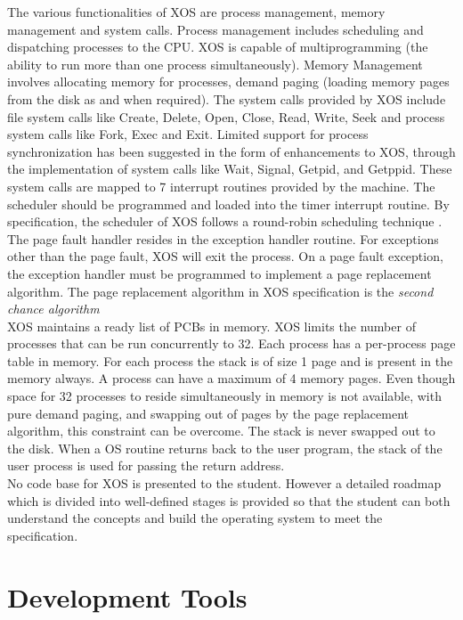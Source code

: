 \documentclass[10pt]{report}
\begin{document}
The various functionalities of XOS are process management, memory management and system calls. Process management includes scheduling and dispatching processes to the CPU. XOS is capable of multiprogramming (the ability to run more than one process simultaneously). Memory Management involves allocating memory for processes, demand paging (loading memory pages from the disk as and when required). The system calls provided by XOS include file system calls like Create, Delete, Open, Close, Read, Write, Seek and process system calls like Fork, Exec and Exit. Limited support for process synchronization has been suggested in the form of enhancements to XOS, through the implementation of system calls like Wait, Signal, Getpid, and Getppid. These system calls are mapped to 7 interrupt routines provided by the machine. The scheduler should be programmed and loaded into the timer interrupt routine. By specification, the scheduler of XOS follows a round-robin scheduling technique \cite{silberschatz}. The page fault handler resides in the exception handler routine. For exceptions other than the page fault, XOS will exit the process. On a page fault exception, the exception handler must be programmed to implement a page replacement algorithm. The page replacement algorithm in XOS specification is the \textit{second chance algorithm}\cite{silberschatz} \\

XOS maintains a ready list of PCBs in memory. XOS limits the number of processes that can be run concurrently to 32. Each process has a per-process page table in memory. For each process the stack is of size 1 page and is present in the memory always. A process can have a maximum of 4 memory pages. Even though space for 32 processes to reside simultaneously in memory is not available, with pure demand paging, and swapping out of pages by the page replacement algorithm, this constraint can be overcome. The stack is never swapped out to the disk. When a OS routine returns back to the user program,  the stack of the user process is used for passing the return address. \\

No code base for XOS is presented to the student. However a detailed roadmap which is divided into well-defined stages is provided so that the student can both understand the concepts and build the operating system to meet the specification.




\chapter{Development Tools}
\end{document}
